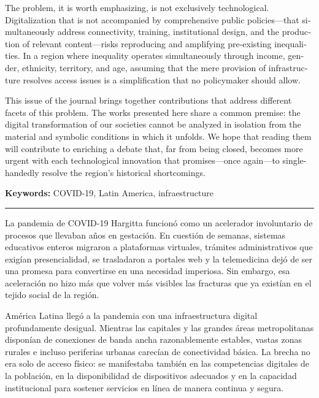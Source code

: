 \documentclass{article}
\begin{document}
\begin{tcolorbox}[colback=brown!8!white,colframe=brown!8!white,boxrule=0pt,arc=2pt,left=4pt,right=4pt,top=3pt,bottom=3pt,before skip=4pt,after skip=4pt]
\begin{otherlanguage}{english}
The problem, it is worth emphasizing, is not exclusively technological. Digitalization that is not accompanied by comprehensive public policies—that simultaneously address connectivity, training, institutional design, and the production of relevant content—risks reproducing and amplifying pre-existing inequalities. In a region where inequality operates simultaneously through income, gender, ethnicity, territory, and age, assuming that the mere provision of infrastructure resolves access issues is a simplification that no policymaker should allow.

This issue of the journal brings together contributions that address different facets of this problem. The works presented here share a common premise: the digital transformation of our societies cannot be analyzed in isolation from the material and symbolic conditions in which it unfolds. We hope that reading them will contribute to enriching a debate that, far from being closed, becomes more urgent with each technological innovation that promises—once again—to single-handedly resolve the region's historical shortcomings.
\par\smallskip\noindent\textbf{Keywords:} COVID-19, Latin America, infraestructure
\end{otherlanguage}
\end{tcolorbox}

\bigskip
\noindent\rule{\linewidth}{0.4pt}
\bigskip

La pandemia de COVID-19 Hargitta funcionó como un acelerador involuntario de procesos que llevaban años en gestación. En cuestión de semanas, sistemas educativos enteros migraron a plataformas virtuales, trámites administrativos que exigían presencialidad, se trasladaron a portales web y la telemedicina dejó de ser una promesa para convertirse en una necesidad imperiosa. Sin embargo, esa aceleración no hizo más que volver más visibles las fracturas que ya existían en el tejido social de la región.

América Latina llegó a la pandemia con una infraestructura digital profundamente desigual. Mientras las capitales y las grandes áreas metropolitanas disponían de conexiones de banda ancha razonablemente estables, vastas zonas rurales e incluso periferias urbanas carecían de conectividad básica. La brecha no era solo de acceso físico: se manifestaba también en las competencias digitales de la población, en la disponibilidad de dispositivos adecuados y en la capacidad institucional para sostener servicios en línea de manera continua y segura.
\end{document}

